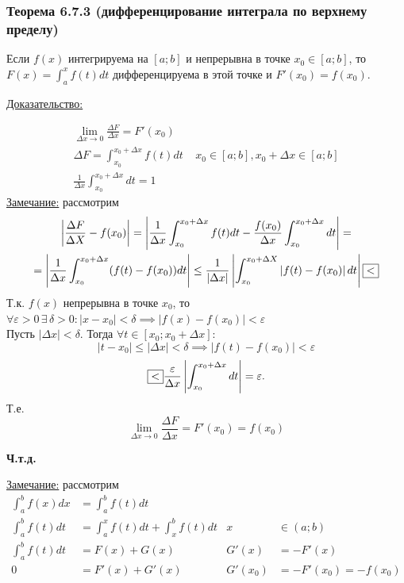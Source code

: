\documentclass[12pt]{article}
\begin{document}
    \subsubsection*{Теорема 6.7.3 (дифференцирование интеграла по верхнему пределу)}\label{th:6.7.3}
    Если $f(x)$ интегрируема на $[a;b]$ и непрерывна в точке $x_0 \in [a;b]$, то $F(x)=\int_{a}^{x}f(t)dt$ дифференцируема в этой точке и $F'(x_0)=f(x_0)$. \par\noindent
    \underline{Доказательство:}\\
    \begin{adjustwidth}{1.5em}{1.5em}
        \begin{gather*}
            \lim_{\Delta x \to 0}  \frac{\Delta F}{\Delta x} = F'(x_0)\\
            \Delta F=\int_{x_0}^{x_0+\Delta x}f(t)dt \;\;\;\; x_0 \in [a;b],x_0+\Delta x \in [a;b]\\
            \frac{1}{\Delta x}\int_{x_0}^{x_0+\Delta x}dt=1
        \end{gather*}
        \underline{Замечание:} рассмотрим 
        \begin{gather*}
            \left|\frac{\Delta F}{\Delta X}-f(x_0)\right| = \left|\frac{1}{\Delta x}\int_{x_0}^{x_0+\Delta x}f(t)dt-\frac{f(x_0)}{\Delta x}\int_{x_0}^{x_0+\Delta x}dt\right| =\\
            = \left|\frac{1}{\Delta x}\int_{x_0}^{x_0+\Delta x}(f(t)-f(x_0))dt\right| \leq \frac{1}{|\Delta x|}\left|\int_{x_0}^{x_0+\Delta X}\left|f(t)-f(x_0)\right|dt\right| \fbox{<}\\
        \end{gather*}
        Т.к. $f(x)$ непрерывна в точке $x_0$, то $\forall \varepsilon > 0\,\exists\,\delta>0:|x-x_0|<\delta \implies |f(x)-f(x_0)|<\varepsilon$\\
        Пусть $|\Delta x| < \delta$. Тогда $\forall t \in [x_0;x_0+\Delta x]$:
        \[ |t-x_0| \leq |\Delta x| < \delta \implies \left|f(t)-f(x_0)\right| < \varepsilon \]
        \[ \fbox{<} \frac{\varepsilon}{\Delta x}\left|\int_{x_0}^{x_0+\Delta x}dt\right|=\varepsilon.\]
        Т.е. 
        \[ \lim_{\Delta x \to 0} \frac{\Delta F}{\Delta x} = F'(x_0)=f(x_0) \]
        \begin{center}
            \textbf{Ч.т.д.}
        \end{center}
    \end{adjustwidth}
    \underline{Замечание:} рассмотрим
    \begin{align*}
        \int_{a}^{b} f(x)dx&=\int_{a}^{b}f(t)dt & &\\
        \int_{a}^{b} f(t)dt&=\int_{a}^{x}f(t)dt+\int_{x}^{b} f(t)dt & x &\in (a;b)\\
        \int_{a}^{b} f(t) dt &= F(x)+G(x) & G'(x)&=-F'(x)\\
        0&=F'(x)+G'(x) & G'(x_0)&=-F'(x_0)=-f(x_0)
    \end{align*}
\end{document}
